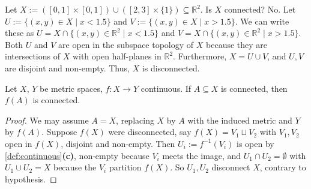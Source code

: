 \begin{example}
Let $X := ([0,1] \times [0,1]) \cup ([2,3] \times \{1\}) \subseteq \mathbb{R}^2$. Is $X$ connected?
No. Let $U := \{(x,y) \in X \mid x < 1.5\}$ and $V := \{(x,y) \in X \mid x > 1.5\}$. We can write these as $U = X \cap \{(x,y) \in \mathbb{R}^2 \mid x < 1.5\}$ and $V = X \cap \{(x,y) \in \mathbb{R}^2 \mid x > 1.5\}$. Both $U$ and $V$ are open in the subspace topology of $X$ because they are intersections of $X$ with open half-planes in $\mathbb{R}^2$. Furthermore, $X = U \cup V$, and $U, V$ are disjoint and non-empty. Thus, $X$ is disconnected.
\begin{center}
\end{center}
\end{example}

\begin{theorem}
\label{thm:continuity_preserves_connected}
Let $X$, $Y$ be metric spaces, $f : X \to Y$ continuous. If $A \subseteq X$ is connected, then
$f(A)$ is connected.
\end{theorem}

\begin{proof}
We may assume $A = X$, replacing $X$ by $A$ with the induced metric and $Y$ by $f(A)$. Suppose
$f(X)$ were disconnected, say $f(X) = V_1 \sqcup V_2$ with $V_1,V_2$ open in $f(X)$, disjoint
and non-empty. Then $U_i := f^{-1}(V_i)$ is open by \cref{def:continuous}\textbf{(c)},
non-empty because $V_i$ meets the image, and $U_1 \cap U_2 = \emptyset$ with
$U_1 \cup U_2 = X$ because the $V_i$ partition $f(X)$. So $U_1,U_2$ disconnect $X$, contrary to
hypothesis.
\end{proof}

